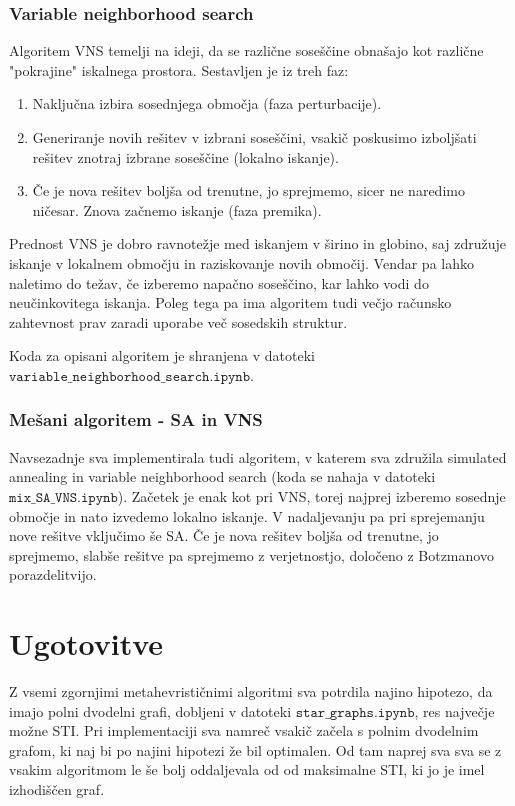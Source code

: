 \documentclass[a4paper,12pt]{article}
\begin{document}
\subsubsection{Variable neighborhood search}
Algoritem VNS temelji na ideji, da se različne soseščine obnašajo kot različne "pokrajine" iskalnega prostora. Sestavljen je iz treh faz:
\begin{enumerate}
      \item Naključna izbira sosednjega območja (faza perturbacije).
      \item Generiranje novih rešitev v izbrani soseščini, vsakič poskusimo izboljšati rešitev znotraj izbrane soseščine (lokalno iskanje).
      \item Če je nova rešitev boljša od trenutne, jo sprejmemo, sicer ne naredimo ničesar. Znova začnemo iskanje (faza premika).
\end{enumerate}
Prednost VNS je dobro ravnotežje med iskanjem v širino in globino, saj združuje iskanje v lokalnem območju in raziskovanje novih območij. Vendar
pa lahko naletimo do težav, če izberemo napačno soseščino, kar lahko vodi do neučinkovitega iskanja. Poleg tega pa ima algoritem tudi večjo
računsko zahtevnost prav zaradi uporabe več sosedskih struktur.

Koda za opisani algoritem je shranjena v datoteki \\$\texttt{variable\_neighborhood\_search.ipynb}$.

\subsubsection{Mešani algoritem - SA in VNS}
Navsezadnje sva implementirala tudi algoritem, v katerem sva združila simulated annealing in variable neighborhood search (koda se nahaja
v datoteki $\texttt{mix\_SA\_VNS.ipynb}$). Začetek je enak kot pri VNS, torej najprej izberemo sosednje območje in nato izvedemo lokalno iskanje. 
V nadaljevanju pa pri sprejemanju nove rešitve vključimo še SA. Če je nova rešitev boljša od trenutne, jo sprejmemo, slabše rešitve pa sprejmemo
z verjetnostjo, določeno z Botzmanovo porazdelitvijo. 

\section{Ugotovitve}
Z vsemi zgornjimi metahevrističnimi algoritmi sva potrdila najino hipotezo, da imajo polni dvodelni grafi, dobljeni v datoteki 
$\texttt{star\_graphs.ipynb}$, res največje možne STI. Pri implementaciji sva namreč vsakič začela s polnim dvodelnim grafom, ki naj 
bi po najini hipotezi že bil optimalen. Od tam naprej sva sva se z vsakim algoritmom le še bolj oddaljevala od od maksimalne STI, ki
jo je imel izhodiščen graf. 
\end{document}
